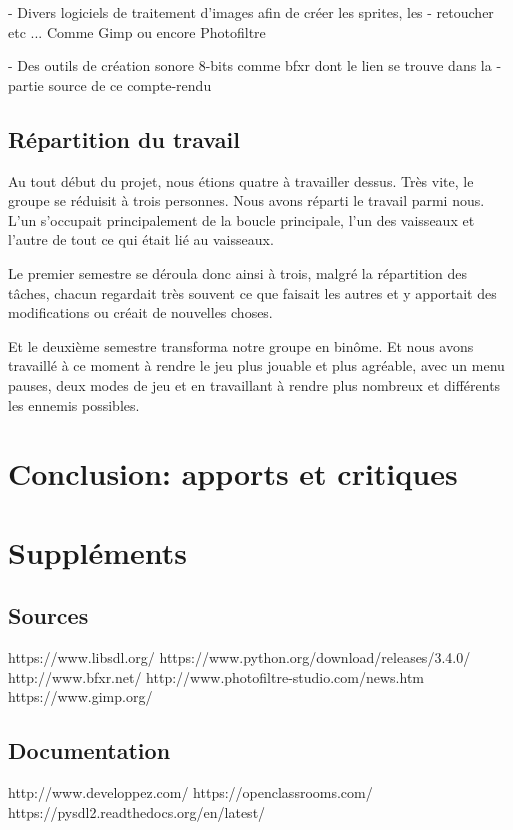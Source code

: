 \documentclass{article}
\begin{document}
- Divers logiciels de traitement d'images afin de créer les sprites, les
- retoucher etc ... Comme Gimp ou encore Photofiltre \newline

- Des outils de création sonore 8-bits comme bfxr dont le lien se trouve dans la
- partie source de ce compte-rendu

\subsection{Répartition du travail}

Au tout début du projet, nous étions quatre à travailler dessus. Très vite, le
groupe se réduisit à trois personnes. Nous avons réparti le travail parmi nous.
L'un s'occupait principalement de la boucle principale, l'un des vaisseaux et
l'autre de tout ce qui était lié au vaisseaux. \newline

Le premier semestre se déroula donc ainsi à trois, malgré la répartition des
tâches, chacun regardait très souvent ce que faisait les autres et y apportait
des modifications ou créait de nouvelles choses. \newline

Et le deuxième semestre transforma notre groupe en binôme. Et nous avons
travaillé à ce moment à rendre le jeu plus jouable et plus agréable, avec un
menu pauses, deux modes de jeu et en travaillant à rendre plus nombreux et
différents les ennemis possibles.

\newpage

\section{Conclusion: apports et critiques}

\newpage

\section{Suppléments}

\subsection{Sources}

\noindent https://www.libsdl.org/ \newline
https://www.python.org/download/releases/3.4.0/ \newline
http://www.bfxr.net/ \newline
http://www.photofiltre-studio.com/news.htm \newline
https://www.gimp.org/


\subsection{Documentation}

\noindent http://www.developpez.com/ \newline
https://openclassrooms.com/ \newline
https://pysdl2.readthedocs.org/en/latest/
\end{document}
